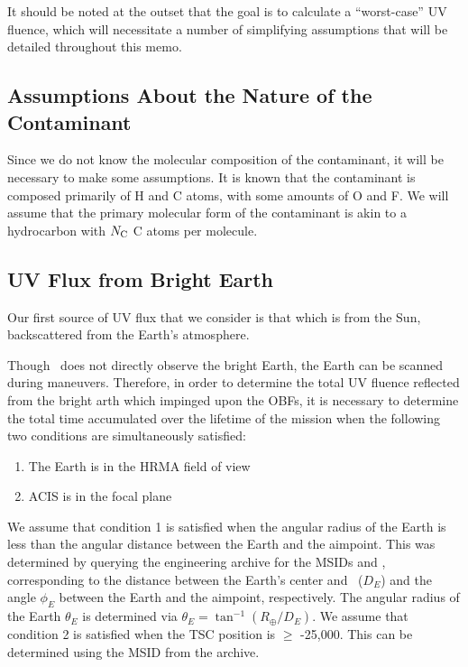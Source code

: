 \documentclass[11pt]{article}
\begin{document}
It should be noted at the outset that the goal is to calculate a ``worst-case'' UV fluence,
which will necessitate a number of simplifying assumptions that will be detailed throughout this
memo.

\subsection{Assumptions About the Nature of the Contaminant}

Since we do not know the molecular composition of the contaminant, it will be necessary to make
some assumptions. It is known that the contaminant is composed primarily of H and C atoms,
with some amounts of O and F. We will assume that the primary molecular form of the contaminant
is akin to a hydrocarbon with $N_{\rm C}$ C atoms per molecule.

\subsection{UV Flux from Bright Earth}

Our first source of UV flux that we consider is that which is from the Sun, backscattered
from the Earth's atmosphere.

Though \chandra~does not directly observe the bright Earth, the Earth can be scanned during
maneuvers. Therefore, in order to determine the total UV fluence reflected from the bright
arth which impinged upon the OBFs, it is necessary to determine the total time accumulated over
the lifetime of the mission when the following two conditions are simultaneously satisfied:

\begin{enumerate}
\item The Earth is in the HRMA field of view
\item ACIS is in the focal plane
\end{enumerate}

We assume that condition 1 is satisfied when the angular radius of the Earth is less than the
angular distance between the Earth and the aimpoint. This was determined by querying
the  engineering archive for the MSIDs  and ,
corresponding to the distance between the Earth's center and \chandra~($D_E$) and the angle $\phi_E$ between
the Earth and the aimpoint, respectively. The angular radius of the Earth $\theta_E$ is determined
via $\theta_E = \tan^{-1} (R_\oplus/D_E)$. We assume that condition 2 is satisfied when the TSC
position is $\geq$ -25,000. This can be determined using the MSID  from the 
archive.
\end{document}
